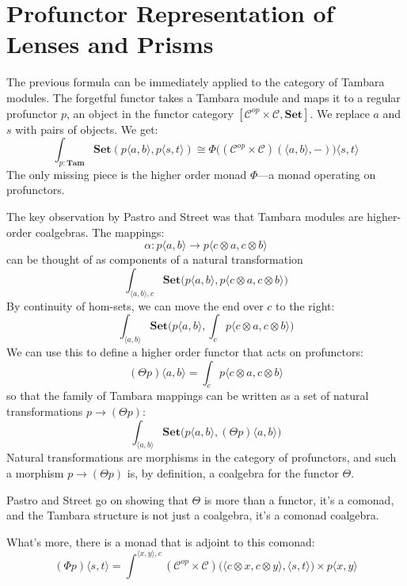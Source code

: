 \documentclass[11pt]{amsart}
\begin{document}
\section{Profunctor Representation of Lenses and Prisms}
The previous formula can be immediately applied to the category of Tambara modules. The forgetful functor takes a Tambara module and maps it to a regular profunctor $p$, an object in the functor category $[\mathcal{C}^{op} \times \mathcal{C}, \mathbf{Set}]$. We replace $a$ and $s$ with pairs of objects. We get:
\[ \int_{p \colon \mathbf{Tam}} \mathbf{Set}(p \langle a, b \rangle, p \langle s, t \rangle) \cong \Phi \big( (\mathcal{C}^{op} \times \mathcal{C})(\langle a, b \rangle, -) \big) \langle s, t \rangle\]
The only missing piece is the higher order monad $\Phi$---a monad operating on profunctors.

The key observation by Pastro and Street was that Tambara modules are higher-order coalgebras. The mappings:
\[ \alpha \colon p \langle a, b \rangle \to p\langle c \otimes a, c \otimes b \rangle \]
can be thought of as components of a natural transformation
\[ \int_{\langle a, b \rangle, c} \mathbf{Set} \big( p \langle a, b \rangle, p\langle c \otimes a, c \otimes b \rangle \big) \]
By continuity of hom-sets, we can move the end over $c$ to the right:
\[ \int_{\langle a, b \rangle} \mathbf{Set} \Big( p \langle a, b \rangle, \int_c p\langle c \otimes a, c \otimes b \rangle \Big) \]
We can use this to define a higher order functor that acts on profunctors:
\[ (\Theta p)\langle a, b \rangle =  \int_c p\langle c \otimes a, c \otimes b \rangle \]
so that the family of Tambara mappings can be written as a set of natural transformations $p \to (\Theta p)$:
\[ \int_{\langle a, b \rangle} \mathbf{Set} \big( p \langle a, b \rangle, (\Theta p)\langle a, b \rangle \big) \]
Natural transformations are morphisms in the category of profunctors, and such a morphism $p \to (\Theta p)$ is, by definition, a coalgebra for the functor $\Theta$.

Pastro and Street go on showing that $\Theta$ is more than a functor, it's a comonad, and the Tambara structure is not just a coalgebra, it's a comonad coalgebra. 

What's more, there is a monad that is adjoint to this comonad:
\[ (\Phi p) \langle s, t \rangle = \int^{\langle x, y \rangle, c} (\mathcal{C}^{op} \times \mathcal{C})\big(\langle c \otimes x, c \otimes y \rangle, \langle s, t \rangle \big) \times p \langle x, y \rangle\]
\end{document}
